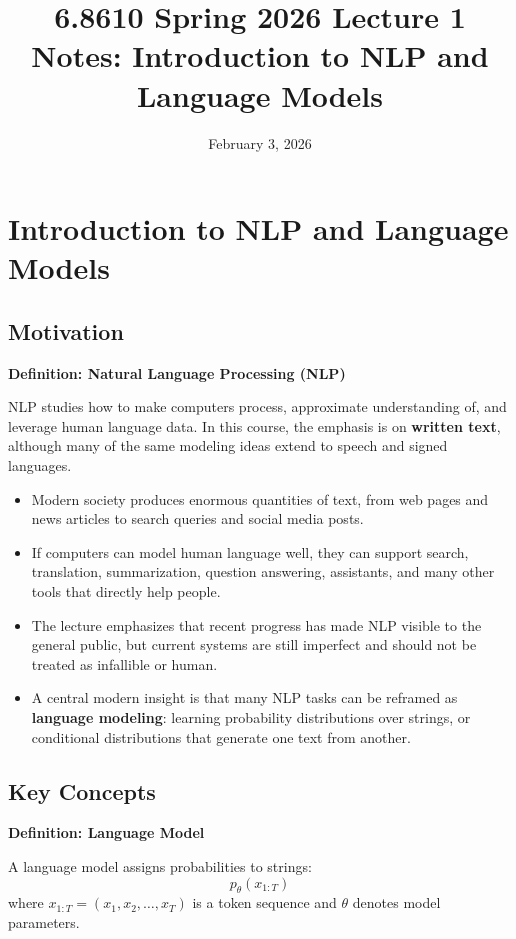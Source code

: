 \documentclass[11pt]{article}
\title{6.8610 Spring 2026 Lecture 1 Notes: Introduction to NLP and Language Models}
\author{}
\date{February 3, 2026}
\begin{document}
\maketitle

\section{Introduction to NLP and Language Models}

\subsection{Motivation}
\textbf{Definition: Natural Language Processing (NLP)}

NLP studies how to make computers process, approximate understanding of, and leverage human language data. In this course, the emphasis is on \textbf{written text}, although many of the same modeling ideas extend to speech and signed languages.

\begin{itemize}
    \item Modern society produces enormous quantities of text, from web pages and news articles to search queries and social media posts.
    \item If computers can model human language well, they can support search, translation, summarization, question answering, assistants, and many other tools that directly help people.
    \item The lecture emphasizes that recent progress has made NLP visible to the general public, but current systems are still imperfect and should not be treated as infallible or human.
    \item A central modern insight is that many NLP tasks can be reframed as \textbf{language modeling}: learning probability distributions over strings, or conditional distributions that generate one text from another.
\end{itemize}

\subsection{Key Concepts}
\textbf{Definition: Language Model}

A language model assigns probabilities to strings:
\[
p_\theta(x_{1:T})
\]
where \(x_{1:T} = (x_1, x_2, \dots, x_T)\) is a token sequence and \(\theta\) denotes model parameters.
\end{document}
